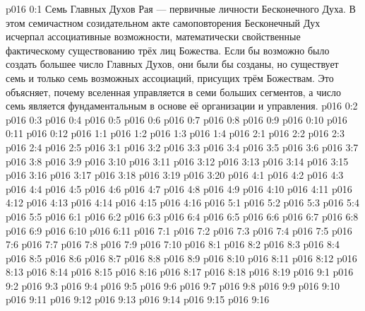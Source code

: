 \author{Всеобщий Цензор}
\vs p016 0:1 Семь Главных Духов Рая --- первичные личности Бесконечного Духа. В этом семичастном созидательном акте самоповторения Бесконечный Дух исчерпал ассоциативные возможности, математически свойственные фактическому существованию трёх лиц Божества. Если бы возможно было создать большее число Главных Духов, они были бы созданы, но существует семь и только семь возможных ассоциаций, присущих трём Божествам. Это объясняет, почему вселенная управляется в семи больших сегментов, а число семь является фундаментальным в основе её организации и управления.
\vs p016 0:2 
\vs p016 0:3 
\vs p016 0:4 
\vs p016 0:5 
\vs p016 0:6 
\vs p016 0:7 
\vs p016 0:8 
\vs p016 0:9 
\vs p016 0:10 \pc 
\vs p016 0:11 
\vs p016 0:12 
\vs p016 1:1 
\vs p016 1:2 
\vs p016 1:3 
\vs p016 1:4 
\vs p016 2:1 
\vs p016 2:2 
\vs p016 2:3 \pc 
\vs p016 2:4 \pc 
\vs p016 2:5 
\vs p016 3:1 
\vs p016 3:2 
\vs p016 3:3 
\vs p016 3:4 \pc 
\vs p016 3:5 
\vs p016 3:6 \pc 
\vs p016 3:7 
\vs p016 3:8 \pc 
\vs p016 3:9 
\vs p016 3:10 \pc 
\vs p016 3:11 
\vs p016 3:12 \pc 
\vs p016 3:13 
\vs p016 3:14 \pc 
\vs p016 3:15 
\vs p016 3:16 
\vs p016 3:17 
\vs p016 3:18 
\vs p016 3:19 
\vs p016 3:20 
\vs p016 4:1 
\vs p016 4:2 
\vs p016 4:3 
\vs p016 4:4 
\vs p016 4:5 
\vs p016 4:6 
\vs p016 4:7 
\vs p016 4:8 \pc 
\vs p016 4:9 
\vs p016 4:10 
\vs p016 4:11 
\vs p016 4:12 
\vs p016 4:13 
\vs p016 4:14 
\vs p016 4:15 
\vs p016 4:16 \pc 
{}
\vs p016 5:1 
\vs p016 5:2 
\vs p016 5:3 
\vs p016 5:4 
\vs p016 5:5 
\vs p016 6:1 
\vs p016 6:2 
\vs p016 6:3 
\vs p016 6:4 \pc 
\vs p016 6:5 
\vs p016 6:6 
\vs p016 6:7 
\vs p016 6:8 
\vs p016 6:9 \pc 
\vs p016 6:10 \pc 
\vs p016 6:11 
\vs p016 7:1 
\vs p016 7:2 
\vs p016 7:3 
\vs p016 7:4 
\vs p016 7:5 
\vs p016 7:6 \pc 
\vs p016 7:7 
\vs p016 7:8 \pc 
\vs p016 7:9 \pc 
\vs p016 7:10 
\vs p016 8:1 
\vs p016 8:2 
\vs p016 8:3 
\vs p016 8:4 
\vs p016 8:5 \pc 
\vs p016 8:6 
\vs p016 8:7 \pc 
\vs p016 8:8 
\vs p016 8:9 
\vs p016 8:10 
\vs p016 8:11 
\vs p016 8:12 
\vs p016 8:13 
\vs p016 8:14 
\vs p016 8:15 \pc 
\vs p016 8:16 
\vs p016 8:17 
\vs p016 8:18 
\vs p016 8:19 \pc 
{}
\vs p016 9:1 
\vs p016 9:2 
\vs p016 9:3 
\vs p016 9:4 \pc 
\vs p016 9:5 
\vs p016 9:6 
\vs p016 9:7 \pc 
\vs p016 9:8 
\vs p016 9:9 
\vs p016 9:10 
\vs p016 9:11 
\vs p016 9:12 
\vs p016 9:13 
\vs p016 9:14 \pc 
\vs p016 9:15 
\vsetoff
\vs p016 9:16 
\quizlink
